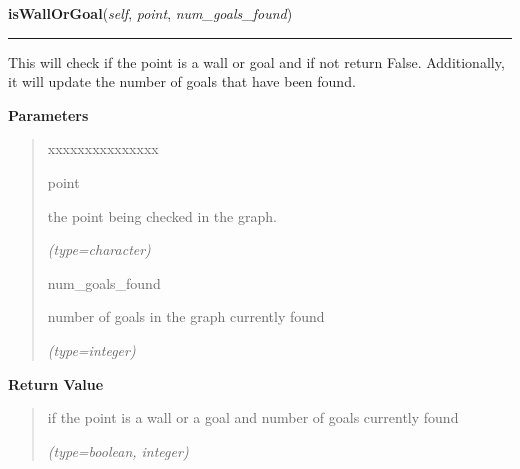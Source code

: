 \hspace{.8\funcindent}\begin{boxedminipage}{\funcwidth}

    \raggedright \textbf{isWallOrGoal}(\textit{self}, \textit{point}, \textit{num\_goals\_found})

    \vspace{-1.5ex}

    \rule{\textwidth}{0.5\fboxrule}
\setlength{\parskip}{2ex}
    This will check if the point is a wall or goal and if not return False.
    Additionally, it will update the number of goals that have been found.

\setlength{\parskip}{1ex}
      \textbf{Parameters}
      \vspace{-1ex}

      \begin{quote}
        \begin{Ventry}{xxxxxxxxxxxxxxx}

          \item[point]

          the point being checked in the graph.

            {\it (type=character)}

          \item[num\_goals\_found]

          number of goals in the graph currently found

            {\it (type=integer)}

        \end{Ventry}

      \end{quote}

      \textbf{Return Value}
    \vspace{-1ex}

      \begin{quote}
      if the point is a wall or a goal and number of goals currently found

      {\it (type=boolean, integer)}

      \end{quote}

    \end{boxedminipage}

    \label{UnBlockMeSolver:Map:Map:Map:largeRowValid}

